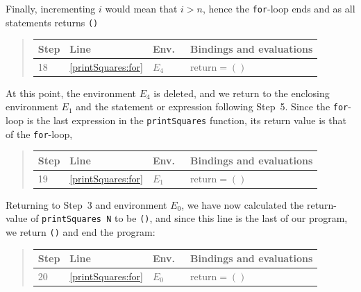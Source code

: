 \documentclass[fsharpNotes.tex]{subfiles}
\begin{document}
Finally, incrementing $i$ would mean that $i>n$, hence the \lstinline{for}-loop ends and as all statements returns \lstinline{()}
\begin{quote}
  \begin{tabular*}{0.9\linewidth}{l|lll}
    Step & Line & Env.\ & Bindings and evaluations\\
    \hline
    18 &\ref{printSquares:for} & $E_4$ & $\text{return} = ()$\\
  \end{tabular*}
\end{quote}
At this point, the environment $E_4$ is deleted, and we return to the enclosing environment $E_1$ and the statement or expression following Step~5. Since the \lstinline{for}-loop is the last expression in the \lstinline{printSquares} function, its return value is that of the \lstinline{for}-loop, 
\begin{quote}
  \begin{tabular*}{0.9\linewidth}{l|lll}
    Step & Line & Env.\ & Bindings and evaluations\\
    \hline
    19 &\ref{printSquares:for} & $E_1$ & $\text{return} = ()$\\
  \end{tabular*}
\end{quote}
Returning to Step~3 and environment $E_0$, we have now calculated the return-value of \lstinline{printSquares N} to be \lstinline{()}, and since this line is the last of our program, we return \lstinline{()} and end the program:
\begin{quote}
  \begin{tabular*}{0.9\linewidth}{l|lll}
    Step & Line & Env.\ & Bindings and evaluations\\
    \hline
    20 &\ref{printSquares:for} & $E_0$ & $\text{return} = ()$\\
  \end{tabular*}
\end{quote}
\end{document}
